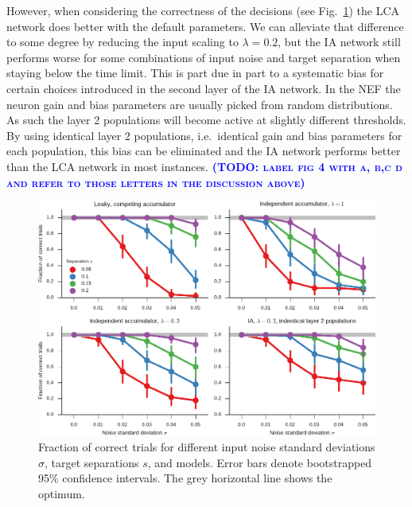 \documentclass[10pt,letterpaper]{article}
\makeatletter
\newcommand{\todo}[1]{\textbf{\textsc{\textcolor{blue}{(TODO\@: #1)}}}}
\makeatother
\begin{document}
However, when considering the correctness of the decisions (see Fig.~\ref{fig:correct}) the LCA network does better with the default parameters.
We can alleviate that difference to some degree by reducing the input scaling to $\lambda = 0.2$, but the IA network still performs worse for some combinations of input noise and target separation when staying below the time limit.
This is part due in part to a systematic bias for certain choices introduced in the second layer of the IA network.
In the NEF the neuron gain and bias parameters are usually picked from random distributions.
As such the layer 2 populations will become active at slightly different thresholds.
By using identical layer 2 populations, i.e.~identical gain and bias parameters for each population, this bias can be eliminated and the IA network performs better than the LCA network in most instances.
\todo{label fig 4 with a, b,c d and refer to those letters in the discussion above}
\begin{figure}
    \centering
    \includegraphics{figures/correct}
    \caption{
        Fraction of correct trials for different input noise standard deviations $\sigma$, target separations $s$, and models.  
        Error bars denote bootstrapped 95\% confidence intervals.
        The grey horizontal line shows the optimum.
    }\label{fig:correct}
\end{figure}
\end{document}
